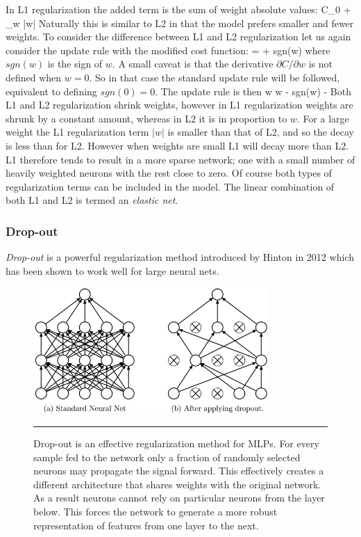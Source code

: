 In L1 regularization the added term is the sum of weight absolute values:
\be
C_0 + \sum_w |w|
\ee
Naturally this is similar to L2 in that the model prefers smaller and fewer weights.
To consider the difference between L1 and L2 regularization let us again consider the update rule with the modified cost function:
\be
{} =  +  sgn(w)
\ee
where $sgn(w)$ is the sign of $w$.
A small caveat is that the derivative $\partial C / \partial w$ is not defined when $w = 0$.
So in that case the standard update rule will be followed\citep{neuralnetworkswebsite}, equivalent to defining $sgn(0) = 0$.
The update rule is then
\be
w \rightarrow w - sgn(w) - \eta {}
\ee
Both L1 and L2 regularization shrink weights, however in L1 regularization weights are shrunk by a constant amount, whereas in L2 it is in proportion to $w$.
For a large weight the L1 regularization term $|w|$ is smaller than that of L2, and so the decay is less than for L2.
However when weights are small L1 will decay more than L2.
L1 therefore tends to result in a more sparse network; one with a small number of heavily weighted neurons with the rest close to zero.
Of course both types of regularization terms can be included in the model.
The linear combination of both L1 and L2 is termed an \textit{elastic net}.

\subsubsection{Drop-out}
\textit{Drop-out} is a powerful regularization method introduced by Hinton\citep{hinton2012improving} in 2012 which has been shown to work well for large neural nets.
\begin{figure}[htbp]
	\centering
		\includegraphics[width = 0.8\textwidth]{./Figures/dropout.jpeg}
		\rule{35em}{0.5pt}
	\caption[Drop-out]{Drop-out is an effective regularization method for MLPs. For every sample fed to the network only a fraction of randomly selected neurons may propagate the signal forward. This effectively creates a different architecture that shares weights with the original network. As a result neurons cannot rely on particular neurons from the layer below. This forces the network to generate a more robust representation of features from one layer to the next.}
	\label{fig:Dropout}
\end{figure}



